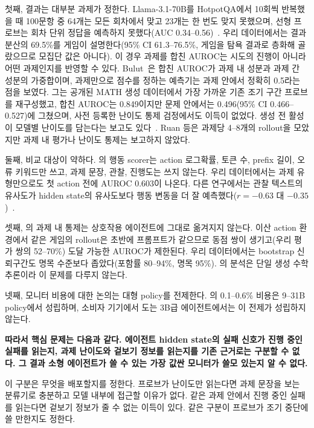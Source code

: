 \documentclass[11pt]{article}
\begin{document}
첫째, 결과는 대부분 과제가 정한다. Llama-3.1-70B를 HotpotQA에서 10회씩 반복했을 때 100문항 중 64개는 모든 회차에서 맞고 23개는 한 번도 맞지 못했으며, 선형 프로브는 회차 단위 정답을 예측하지 못했다(AUC 0.34--0.56)~\cite{mehta2026commit}.
우리 데이터에서는 결과 분산의 69.5\%를 게임이 설명한다(95\% CI 61.3--76.5\%, 게임을 탐욕 결과로 층화해 골랐으므로 모집단 값은 아니다). 이 경우 과제를 합친 AUROC는 시도의 진행이 아니라 어떤 과제인지를 반영할 수 있다.
Bulut~\cite{bulut2026problem}은 합친 AUROC가 과제 내 성분과 과제 간 성분의 가중합이며, 과제만으로 점수를 정하는 예측기는 과제 안에서 정확히 0.5라는 점을 보였다.
그는 공개된 MATH 생성 데이터에서 가장 가까운 기존 조기 구간 프로브를 재구성했고, 합친 AUROC는 0.849이지만 문제 안에서는 0.496(95\% CI 0.466--0.527)에 그쳤으며, 사전 등록한 난이도 통제 검정에서도 이득이 없었다.
생성 전 활성이 모델별 난이도를 담는다는 보고도 있다~\cite{lugoloobi2026failures}. Ruan 등은 과제당 4--8개의 rollout을 모았지만 과제 내 평가나 난이도 통제는 보고하지 않았다.

둘째, 비교 대상이 약하다. \cite{ruan2026doomed}의 행동 scorer는 action 로그확률, 토큰 수, prefix 길이, 오류 키워드만 쓰고, 과제 문장, 관찰, 진행도는 쓰지 않는다.
우리 데이터에서는 과제 유형만으로도 첫 action 전에 AUROC 0.603이 나온다. 다른 연구에서는 관찰 텍스트의 유사도가 hidden state의 유사도보다 행동 변동을 더 잘 예측했다($r=-0.63$ 대 $-0.35$)~\cite{mehta2026commit}.

셋째, \cite{bulut2026problem}의 과제 내 통제는 상호작용 에이전트에 그대로 옮겨지지 않는다. 이산 action 환경에서 같은 게임의 rollout은 초반에 프롬프트가 같으므로 동점 쌍이 생기고(우리 평가 쌍의 52--70\%) 도달 가능한 AUROC가 제한된다.
우리 데이터에서는 bootstrap 신뢰구간도 명목 수준보다 좁았다(포함률 80--94\%, 명목 95\%). \cite{bulut2026problem}의 분석은 단일 생성 수학 추론이라 이 문제를 다루지 않는다.

넷째, 모니터 비용에 대한 논의는 대형 policy를 전제한다. \cite{wang2026failfast}의 0.1--0.6\% 비용은 9--31B policy에서 성립하며, 소비자 기기에서 도는 3B급 에이전트에서는 이 전제가 성립하지 않는다.

\textbf{따라서 핵심 문제는 다음과 같다. 에이전트 hidden state의 실패 신호가 진행 중인 실패를 읽는지, 과제 난이도와 겉보기 정보를 읽는지를 기존 근거로는 구분할 수 없다. 그 결과 소형 에이전트가 쓸 수 있는 가장 값싼 모니터가 쓸모 있는지 알 수 없다.}

이 구분은 무엇을 배포할지를 정한다. 프로브가 난이도만 읽는다면 과제 문장을 보는 분류기로 충분하고 모델 내부에 접근할 이유가 없다. 같은 과제 안에서 진행 중인 실패를 읽는다면 겉보기 정보가 줄 수 없는 이득이 있다.
같은 구분이 프로브가 조기 중단에 쓸 만한지도 정한다.
\end{document}
